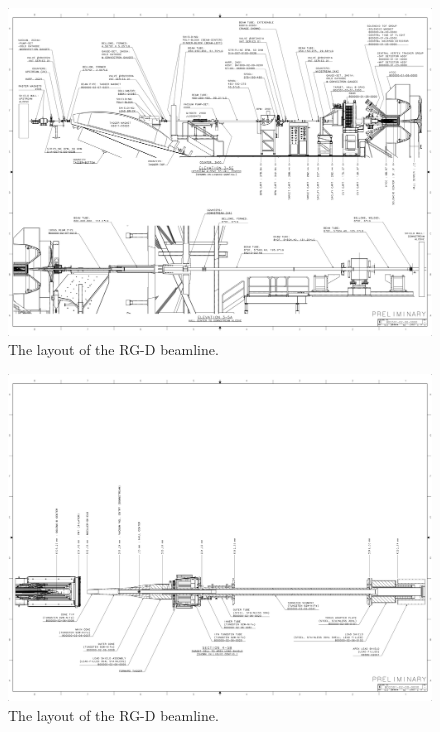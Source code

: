 \documentclass[11pt]{article}
\begin{document}
{\begin{figure}[hbt]
\vspace{-2cm}
\begin{center}
\includegraphics[width=9in,angle=90]{RGD_beamline_p3.pdf}
\end{center}
\caption{ \label{fig:beamline3} 
The layout of the RG-D beamline. }
\end{figure}

\begin{figure}[hbt]
\vspace{-2cm}
\begin{center}
\includegraphics[width=9in,angle=90]{RGD_beamline_p4.pdf}
\end{center}
\caption{ \label{fig:beamline4}
The layout of the RG-D beamline.}
\end{figure}

}
\end{document}
